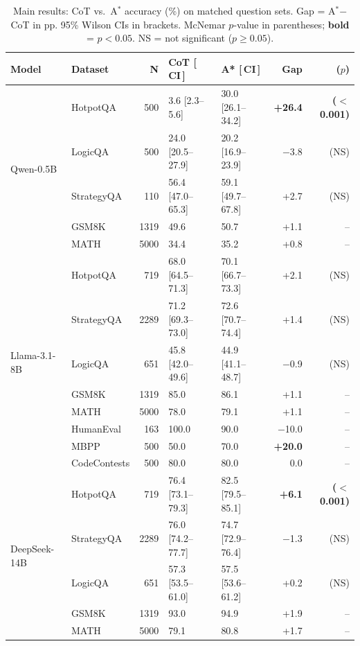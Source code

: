 \documentclass{article}
\newcommand{\astar}{A$^*$\xspace}
\begin{document}
\begin{table}[h]
\centering
\caption{Main results: CoT vs.\ \astar accuracy (\%) on matched question sets.
  Gap = \astar$-$CoT in pp. 95\% Wilson CIs in brackets.
  McNemar $p$-value in parentheses; \textbf{bold} = $p<0.05$.
  NS = not significant ($p\geq0.05$).}
\label{tab:main}
\small
\begin{tabular}{llrllrr}
\toprule
Model & Dataset & N & CoT [\,CI\,] & A* [\,CI\,] & Gap & ($p$) \\
\midrule
\multirow{5}{*}{Qwen-0.5B}
  & HotpotQA           & 500 & 3.6 [2.3--5.6]     & 30.0 [26.1--34.2] & \textbf{+26.4} & \textbf{($<$0.001)} \\
  & LogicQA            & 500 & 24.0 [20.5--27.9]  & 20.2 [16.9--23.9] & $-$3.8 & (NS) \\
  & StrategyQA         & 110 & 56.4 [47.0--65.3]  & 59.1 [49.7--67.8] & +2.7   & (NS) \\
  & GSM8K              & 1319 & 49.6               & 50.7              & +1.1   & -- \\
  & MATH               & 5000 & 34.4               & 35.2              & +0.8   & -- \\
\midrule
\multirow{8}{*}{Llama-3.1-8B}
  & HotpotQA           & 719  & 68.0 [64.5--71.3]  & 70.1 [66.7--73.3] & +2.1 & (NS) \\
  & StrategyQA         & 2289 & 71.2 [69.3--73.0]  & 72.6 [70.7--74.4] & +1.4 & (NS) \\
  & LogicQA            & 651  & 45.8 [42.0--49.6]  & 44.9 [41.1--48.7] & $-$0.9 & (NS) \\
  & GSM8K              & 1319 & 85.0               & 86.1              & +1.1   & -- \\
  & MATH               & 5000 & 78.0               & 79.1              & +1.1   & -- \\
  & HumanEval          & 163  & 100.0              & 90.0              & $-$10.0 & -- \\
  & MBPP               & 500  & 50.0               & 70.0              & \textbf{+20.0}  & -- \\
  & CodeContests       & 500  & 80.0               & 80.0              & 0.0    & -- \\
\midrule
\multirow{5}{*}{DeepSeek-14B}
  & HotpotQA           & 719  & 76.4 [73.1--79.3]  & 82.5 [79.5--85.1] & \textbf{+6.1} & \textbf{($<$0.001)} \\
  & StrategyQA         & 2289 & 76.0 [74.2--77.7]  & 74.7 [72.9--76.4] & $-$1.3 & (NS) \\
  & LogicQA            & 651  & 57.3 [53.5--61.0]  & 57.5 [53.6--61.2] & +0.2   & (NS) \\
  & GSM8K              & 1319 & 93.0               & 94.9              & +1.9   & -- \\
  & MATH               & 5000 & 79.1               & 80.8              & +1.7   & -- \\
\bottomrule
\end{tabular}
\end{table}
\end{document}

